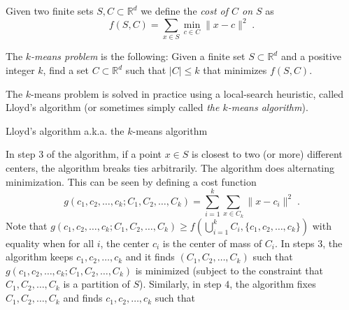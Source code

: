 \documentclass{article}
\newcommand{\R}{\mathbb{R}}
\newcommand{\norm}[1]{\|{#1}\|}
\begin{document}
Given two finite sets $S,C \subset \R^d$ we define the \emph{cost of $C$ on $S$}
as
$$
f(S,C) = \sum_{x \in S} \min_{c \in C} \norm{x-c}^2 \; .
$$

The \emph{$k$-means problem} is the following:
Given a finite set $S \subset \R^d$ and a positive integer $k$, find a set $C \subset \R^d$
such that $|C| \le k$ that minimizes $f(S,C)$.

The $k$-means problem is solved in practice using a local-search heuristic,
called Lloyd's algorithm (or sometimes simply called \emph{the $k$-means
algorithm}).

\begin{algorithm}[h]
\caption{Lloyd's algorithm a.k.a. the $k$-means algorithm
\label{algorithm:lloyd}}
\begin{algorithmic}[1]
{
\STATE{Initialize $c_1, c_2, \dots, c_k \in \R^d$ somehow}
\ENDWHILE
}
\end{algorithmic}
\end{algorithm}

In step $3$ of the algorithm, if a point $x \in S$ is closest to two (or more) different centers,
the algorithm breaks ties arbitrarily. The algorithm does alternating minimization.
This can be seen by defining a cost function
$$
g(c_1, c_2, \dots, c_k; C_1, C_2, \dots, C_k) = \sum_{i=1}^k \sum_{x \in C_k} \norm{x - c_i}^2 \; .
$$
Note that $g(c_1, c_2, \dots, c_k; C_1, C_2, \dots, C_k) \ge f(\bigcup_{i=1}^k C_i, \{c_1, c_2, \dots, c_k\})$
with equality when for all $i$, the center $c_i$ is the center of mass of $C_i$.
In steps $3$, the algorithm keeps $c_1, c_2, \dots, c_k$ and
it finds $(C_1, C_2, \dots, C_k)$ such that $g(c_1, c_2, \dots, c_k; C_1, C_2, \dots, C_k)$
is minimized (subject to the constraint that $C_1, C_2, \dots, C_k$ is a partition of $S$). Similarly, in step $4$,
the algorithm fixes $C_1, C_2, \dots, C_k$ and finds $c_1, c_2, \dots, c_k$ such that
\end{document}
